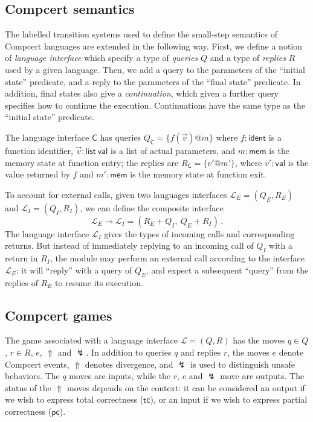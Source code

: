 \documentclass{article}
\newcommand{\kw}[1]{{\mathsf{#1}}}
\begin{document}
\subsection{Compcert semantics}

The labelled transition systems
used to define the small-step semantics of Compcert languages
are extended in the following way.
First,
we define a notion of \emph{language interface}
which specify a type of \emph{queries} $Q$ and a type of \emph{replies} $R$
used by a given language.
Then, we add a query to the parameters of the ``initial state'' predicate,
and a reply to the parameters of the ``final state'' predicate.
In addition,
final states also give a \emph{continuation},
which given a further query specifies how to continue the execution.
Continuations have the same type as the ``initial state'' predicate.

The language interface $\kw{C}$
has queries $Q_\kw{C} = \{ f(\vec{v})@m \}$
where $f : \kw{ident}$ is a function identifier,
$\vec{v} : \kw{list}\ \kw{val}$ is a list of actual parameters, and
$m : \kw{mem}$ is the memory state at function entry;
the replies are $R_\kw{C} = \{ v'@m' \}$,
where $v' : \kw{val}$ is the value returned by $f$ and
$m' : \kw{mem}$ is the memory state at function exit.

To account for external calls,
given two languages interfaces
$\mathcal{L}_E = (Q_E, R_E)$ and
$\mathcal{L}_I = (Q_I, R_I)$,
we can define the composite interface
\[ \mathcal{L}_E \multimap \mathcal{L}_I = (R_E + Q_I, \: Q_E + R_I)\,. \]
The language interface $\mathcal{L}_I$
gives the types of incoming calls and corresponding returns.
But instead of immediately replying to an incoming call of $Q_I$
with a return in $R_I$,
the module may perform an external call
according to the interface $\mathcal{L}_E$:
it will ``reply'' with a query of $Q_E$,
and expect a subsequent ``query'' from the replies of $R_E$
to resume its execution.

\subsection{Compcert games}

The game associated with a language interface $\mathcal{L} = (Q, R)$
has the moves $q \in Q$, $r \in R$, $e$, $\Uparrow$ and $\lightning$.
In addition to queries $q$ and replies $r$,
the moves $e$ denote Compcert events,
$\Uparrow$ denotes divergence,
and $\lightning$ is used to distinguish unsafe behaviors.
The $q$ moves are inputs,
while the $r$, $e$ and $\lightning$ move are outputs.
The status of the $\Uparrow$ moves depends on the context:
it can be considered
an output if we wish to express total correctness ($\kw{tc}$), or
an input if we wish to express partial correctness ($\kw{pc}$).
\end{document}
